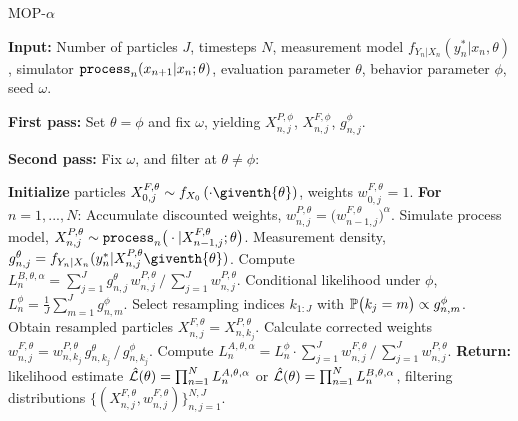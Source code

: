 \documentclass[9pt,twocolumn,pnasresearcharticle]{pnas-new}
\begin{document}
\begin{algorithm}[htbp!]
	\caption{MOP-$\alpha$}
    \label{alg:mop}
	     \textbf{Input:} Number of particles $J$, timesteps $N$, measurement model $f_{Y_n|X_n}(y_n^*|x_n, \theta)$, simulator $\texttt{process}_n(x_{n+1}|x_n; \theta)$, evaluation parameter $\theta$, behavior parameter $\phi$, seed $\omega$.
      
        \textbf{First pass:} Set $\theta=\phi$ and fix $\omega$, yielding $X_{n,j}^{P,\phi}$, $X_{n,j}^{F,\phi}$, $g^{\phi}_{n,j}$.
            
        \textbf{Second pass:}
        Fix $\omega$, and filter at $\theta\neq \phi$:
            
		\textbf{Initialize } particles ${X}_{0,j}^{F,\theta}\sim {f}_{{X}_{0}}\left(\cdot\giventh{\theta}\right)$, weights $w^{F,\theta}_{0,j}= 1$. \newline
		\textbf{For} $n=1,...,N$: \newline
            \hspace*{4mm} Accumulate discounted weights, $w_{n,j}^{P,\theta} = \big(w_{n-1,j}^{F,\theta}\big)^\alpha$.\newline
            \hspace*{4mm} Simulate process model,
            ${X}_{n,j}^{P,\theta}\sim \texttt{process}_n\big(\cdot|{X}_{n-1,j}^{F, \theta};{\theta}\big)$. \newline
            \hspace*{4mm} Measurement density,
            $g^{\theta}_{n,j}={f}_{{Y}_{n}|{X}_{n}}(y_{n}^{*}|{X}_{n,j}^{P,\theta}\giventh{\theta})$. \newline
            \hspace*{4mm} Compute $L_n^{B,\theta,\alpha} ={\sum_{j=1}^Jg^\theta_{n,j} \, w^{P,\theta}_{n,j}}\, \big/\, {\sum_{j=1}^J  w^{P,\theta}_{n,j}}$. \newline
            \hspace*{4mm} Conditional likelihood under $\phi$,
            $L_n^{\phi} = \frac{1}{J}\sum_{m=1}^{J}g^{\phi}_{n,m}$.\newline
            \hspace*{4mm} Select resampling indices $k_{1:J}$ with $\mathbb{P}\big(k_{j}=m\big) \propto g^{\phi}_{n,m}$. \newline
            \hspace*{4mm} Obtain resampled particles ${X}_{n,j}^{F,\theta}={X}_{n,k_{j}}^{P,\theta}$. \newline
            \hspace*{4mm} Calculate corrected weights
            $w_{n,j}^{F,\theta}= w^{P,\theta}_{n,k_j} \, g^{\theta}_{n,k_j} \, \big/ \, { g^{\phi}_{n,k_j}}$.\newline
            \hspace*{4mm} Compute $ L_n^{A,\theta,\alpha} = L_n^\phi\cdot {\sum_{j=1}^J w^{F,\theta}_{n,j}} \, \big/ \, {\sum_{j=1}^J  w^{P,\theta}_{n,j}}$.\newline
		\textbf{Return:} likelihood estimate $\hat{\mathcal{L}}(\theta) = \prod_{n=1}^N L_n^{A,\theta,\alpha}$ or $\hat{\mathcal{L}}(\theta) = \prod_{n=1}^N L_n^{B,\theta,\alpha}$, filtering distributions $\{(X_{n,j}^{F, \theta}, w^{F,\theta}_{n,j})\}_{n,j=1}^{N,J}.$
\end{algorithm}
\end{document}
